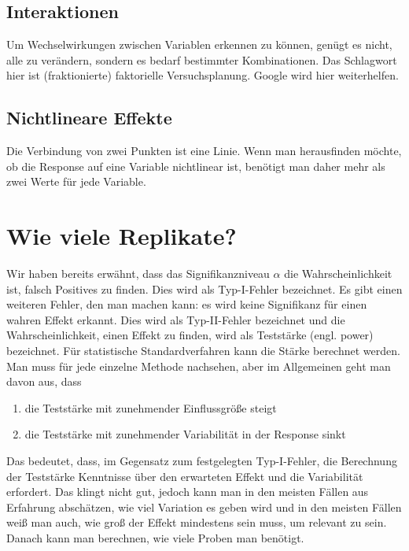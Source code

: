\documentclass[a4paper,twoside]{tufte-book}\usepackage[]{graphicx}\usepackage[]{color}
\begin{document}
\subsection{Interaktionen}

Um Wechselwirkungen zwischen Variablen erkennen zu können, genügt es nicht, alle zu verändern, sondern es bedarf bestimmter Kombinationen. Das Schlagwort hier ist (fraktionierte) faktorielle Versuchsplanung. Google wird hier weiterhelfen.

\subsection{Nichtlineare Effekte}

Die Verbindung von zwei Punkten ist eine Linie. Wenn man herausfinden möchte, ob die Response auf eine Variable nichtlinear ist, benötigt man daher mehr als zwei Werte für jede Variable. 


\section{Wie viele Replikate?}

Wir haben bereits erwähnt, dass das Signifikanzniveau $\alpha$ die Wahrscheinlichkeit ist, falsch Positives zu finden. Dies wird als Typ-I-Fehler bezeichnet. Es gibt einen weiteren Fehler, den man machen kann: es wird keine Signifikanz für einen wahren Effekt erkannt. Dies wird als Typ-II-Fehler bezeichnet und die Wahrscheinlichkeit, einen Effekt zu finden, wird als Teststärke (engl. power) bezeichnet. Für statistische Standardverfahren kann die Stärke berechnet werden. Man muss für jede einzelne Methode nachsehen, aber im Allgemeinen geht man davon aus, dass 

\begin{enumerate}
\item die Teststärke mit zunehmender Einflussgröße steigt 
\item die Teststärke mit zunehmender Variabilität in der Response sinkt
\end{enumerate}

Das bedeutet, dass, im Gegensatz zum festgelegten Typ-I-Fehler, die Berechnung der Teststärke Kenntnisse über den erwarteten Effekt und die Variabilität erfordert. Das klingt nicht gut, jedoch kann man in den meisten Fällen aus Erfahrung abschätzen, wie viel Variation es geben wird und in den meisten Fällen weiß man auch, wie groß der Effekt mindestens sein muss, um relevant zu sein. Danach kann man berechnen, wie viele Proben man benötigt.
\end{document}
